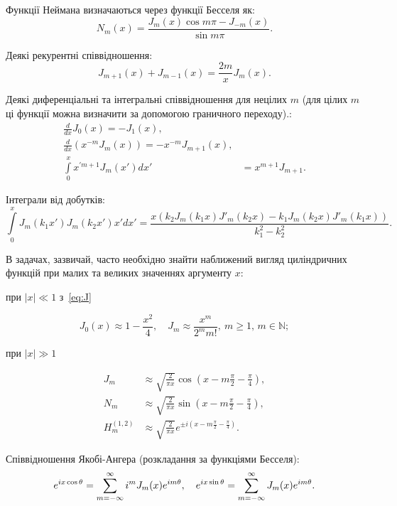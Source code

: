 Функції Неймана визначаються через функції Бесселя як:
\begin{equation}\label{eq:NG}
    N_m(x) = \frac{J_m(x)\cos m\pi - J_{-m}(x)}{\sin m\pi}.
\end{equation}


Деякі рекурентні співвідношення:
\begin{equation}
    J_{m + 1}(x) + J_{m - 1}(x) = \frac{2m}{x}J_m(x).
\end{equation}

Деякі диференціальні та інтегральні співвідношення для нецілих $m$ (для цілих $m$ ці функції можна визначити за допомогою граничного переходу).:
\begin{align}
    \frac{d}{dx} J_0(x) = - J_1(x), \\
    \frac{d}{dx} \left( x^{-m}J_m(x)\right)  = - x^{-m}J_{m+1}(x), \\
     \int\limits_0^{x} x^{\prime m+1} J_m(x') dx' &= x^{m+1}J_{m+1}. \label{eq:recInt} 
\end{align}

Інтеграли від добутків:
\begin{equation}
    \int\limits_0^x  J_m(k_1x')J_m(k_2x') x' dx' = \frac{x\left( k_2J_m(k_1x)J'_m(k_2x) - k_1J_m(k_2x)J'_m(k_1x)\right)}{k_1^2-k_2^{2}}   \label{eq:JJ0*}.
\end{equation} 

В задачах, зазвичай, часто необхідно знайти наближений вигляд циліндричних функцій при малих та великих значеннях аргументу $x$:

при $|x| \ll 1$ з~\eqref{eq:J}

\begin{equation}
    J_0(x) \approx 1 - \frac{x^2}{4}, \quad
    J_m \approx \frac{x^m}{2^m m!}, \ m \ge 1,\, m \in \mathbb{N};
\end{equation}

при $|x| \gg 1$ 

\begin{align}
    J_m &\approx \sqrt{\frac{2}{\pi x}}  \cos\left( x - m\frac{\pi}{2} - \frac{\pi}{4}\right), 
      \label{eq:Jxgg1}\\
    N_m &\approx \sqrt{\frac{2}{\pi x}}  \sin\left( x - m\frac{\pi}{2} - \frac{\pi}{4}\right), 
  \label{eq:Yxgg1}\\
    H_m^{(1,2)} &\approx \sqrt{\frac{2}{\pi x}}  e^{\pm i \left( x - m\frac{\pi}{2} - \frac{\pi}{4}\right) }. \label{eq:Hxgg1}
\end{align}

Співвідношення Якобі-Ангера (розкладання за функціями Бесселя):
\begin{equation}\label{eq:JacobiAnger}
    e^{ix\cos\theta} = \sum\limits_{m= - \infty}^{\infty} i^mJ_m(x)e^{im\theta}, \quad
    e^{ix\sin\theta} = \sum\limits_{m= - \infty}^{\infty} J_m(x)e^{im\theta}. \\
\end{equation}

